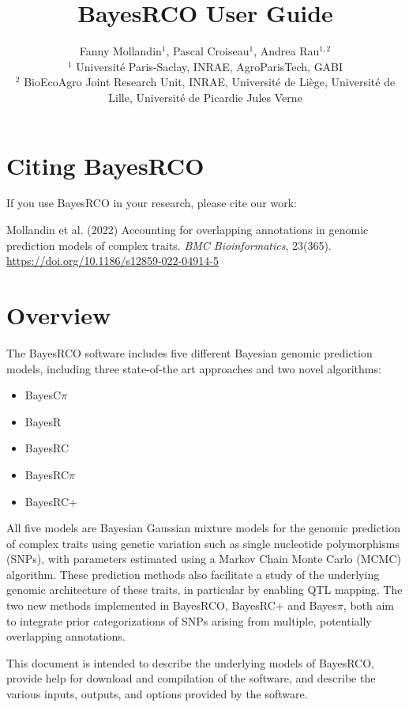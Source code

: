 \documentclass{ol-softwaremanual}
\title{BayesRCO User Guide
}
\author{Fanny Mollandin$^{1}$, Pascal Croiseau$^{1}$, Andrea Rau$^{1,2}$\\ \vspace*{.5cm}
{\footnotesize
$^{1}$ Université Paris-Saclay, INRAE, AgroParisTech, GABI\\
$^{2}$ BioEcoAgro Joint Research Unit, INRAE, Université de Liège, Université de Lille, Université de Picardie Jules Verne\\ \vspace*{.5cm}
}}
\begin{document}
\maketitle

\tableofcontents
\newpage

\section{Citing BayesRCO}

If you use BayesRCO in your research, please cite our work:

\begin{tcolorbox}
Mollandin et al. (2022) Accounting for overlapping annotations in genomic prediction models of complex traits. \textit{BMC Bioinformatics}, 23(365). \url{https://doi.org/10.1186/s12859-022-04914-5}
\end{tcolorbox}

\section{Overview}
The BayesRCO software includes five different Bayesian genomic prediction models, including three state-of-the art approaches and two novel algorithms:

\begin{itemize}
    \item BayesC$\pi$ \citep{habier_extension_2011}
    \item BayesR \citep{erbe_improving_2012}
    \item BayesRC \citep{macleod_exploiting_2016}
    \item BayesRC$\pi$ \citep{mollandin_2022}
    \item BayesRC+ \citep{mollandin_2022}
\end{itemize}  

All five models are Bayesian Gaussian mixture models for the genomic prediction of complex traits using genetic variation such as single nucleotide polymorphisms (SNPs), with parameters estimated using a Markov Chain Monte Carlo (MCMC) algorithm. These prediction methods also facilitate a study of the underlying genomic architecture of these traits, in particular by enabling QTL mapping. The two new methods implemented in BayesRCO, BayesRC+ and Bayes$\pi$, both aim to integrate prior categorizations of SNPs arising from multiple, potentially overlapping annotations. 

This document is intended to describe the underlying models of BayesRCO, provide help for download and compilation of the software, and describe the various inputs, outputs, and options provided by the software.
\vspace*{.5cm}
\end{document}
